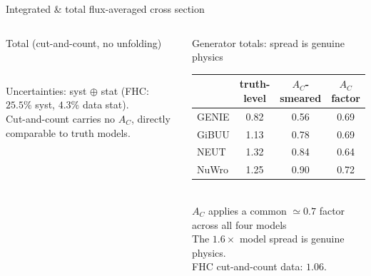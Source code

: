 \documentclass[aspectratio=169,10pt]{beamer}
\begin{document}
\begin{frame}{Integrated \& total flux-averaged cross section}
\begin{columns}[T]
\begin{block}{Total (cut-and-count, no unfolding)}
\begin{tabular}{lc}
  \bottomrule
  \end{tabular}\\[0.5mm]
  {\tiny Uncertainties: \alert{syst $\oplus$ stat} (FHC: $25.5\%$ syst, $4.3\%$ data stat).\\ Cut-and-count carries \alert{no} $A_C$, directly comparable to truth models.}
  \end{block}
  \vspace{-2mm}
  \begin{block}{\small Generator totals: spread is genuine physics}\scriptsize
  \centering
  \begin{tabular}{lccc}
  \toprule
   & truth-level & $A_C$-smeared & $A_C$ factor\\\midrule
  GENIE & 0.82 & 0.56 & 0.69\\
  GiBUU & 1.13 & 0.78 & 0.69\\
  NEUT  & 1.32 & 0.84 & 0.64\\
  NuWro & 1.25 & 0.90 & 0.72\\
  \bottomrule
  \end{tabular}\\[0.5mm]
  {\tiny $A_C$ applies a \alert{common} $\simeq\!0.7$ factor across all four models \\The \alert{$1.6\times$ model spread} is genuine physics.\\ FHC cut-and-count data: $1.06$.}
  \end{block}
  \end{columns}
\end{frame}
\end{document}
